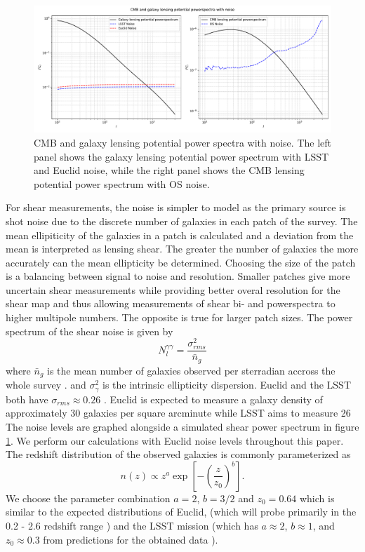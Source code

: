 \documentclass[11pt]{article} %
\newcommand{\br}[1]{\ensuremath{\left( #1 \right)}}
\newcommand{\sbr}[1]{\ensuremath{\left[ #1 \right]}}
\begin{document}
\begin{figure}[t]
    \centering
    \includegraphics[width=\textwidth]{figures/spectraplusnoise.pdf}
    \caption{CMB and galaxy lensing potential power spectra with noise. The left panel shows the galaxy lensing potential power spectrum with LSST and Euclid noise, while the right panel shows the CMB lensing potential power spectrum with OS noise.}
    \label{fig:lpsplusnoise}
\end{figure}


For shear measurements, the noise is simpler to model as the primary source is shot noise due to the discrete number of galaxies in each patch of the survey. The mean ellipiticity of the galaxies in a patch is calculated and a deviation from the mean is interpreted as lensing shear. The greater the number of galaxies the more accurately can the mean ellipticity be determined. Choosing the size of the patch is a balancing between signal to noise and resolution. Smaller patches give more uncertain shear measurements while providing better overal resolution for the shear map and thus allowing measurements of shear bi- and powerspectra to higher multipole numbers. The opposite is true for larger patch sizes. The power spectrum of the shear noise is given by
\begin{equation*}
    N^{\gamma\gamma}_{l} = \frac{\sigma^2_{rms}}{\bar n_g}
\end{equation*}
where $\bar n_g$ is the mean number of galaxies observed per sterradian accross the whole survey \cite{weaklensingnotes2020}.
and $\sigma^2_\gamma$ is the intrinsic ellipticity dispersion. 
Euclid and the LSST both have $\sigma_{rms} \approx 0.26$ \cite{euclid1overview} \cite{lsstsciencebook}.
Euclid is expected to measure a galaxy density of approximately 30 galaxies per square arcminute \cite{euclidprep1}
while LSST aims to measure 26 \cite{galaxydenslsst}
The noise levels are graphed alongside a simulated shear power spectrum in figure \ref{fig:lpsplusnoise}. We perform our calculations with Euclid noise levels throughout this paper.
The redshift distribution of the observed galaxies is commonly parameterized as \cite{bartelmann2001weak}
\begin{equation*}
    n(z) \propto z^a \exp\sbr{-\br{\frac{z}{z_0}}^b}.
\end{equation*}
We choose the parameter combination $a = 2$, $b = 3/2$ and $z_0 = 0.64$ which is similar to the expected distributions of Euclid, (which will probe primarily in the 0.2 - 2.6 redshift range \cite{euclidprep10})
and the LSST mission (which has $a \approx 2$, $b \approx 1$, and $z_0 \approx 0.3$ from predictions for the obtained data \cite{lsstsciencebookchapter3}).
\end{document}
